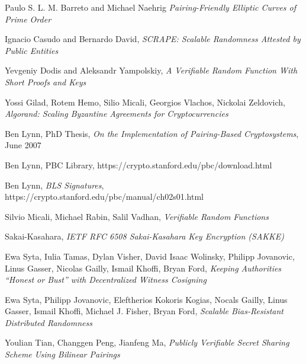 \documentclass{yellowpaper}
\begin{document}
\begin{thebibliography}{99}

Paulo S. L. M. Barreto and Michael Naehrig
{\em{Pairing-Friendly Elliptic Curves of Prime Order}}

Ignacio Casudo and Bernardo David, 
{\em{ SCRAPE: Scalable Randomness Attested by Public Entities}} 

Yevgeniy Dodis and Aleksandr Yampolskiy, 
{\em{A Verifiable Random Function With Short Proofs and Keys}}

Yossi Gilad, Rotem Hemo, Silio Micali, Georgios Vlachos, Nickolai Zeldovich,
{\em{Algorand: Scaling Byzantine Agreements for Cryptocurrencies}}

 Ben Lynn, PhD Thesis, 
{\em{On the Implementation of Pairing-Based Cryptosystems}}, June 2007

 Ben Lynn, PBC Library, 
https://crypto.stanford.edu/pbc/download.html

 Ben Lynn, 
{\em{BLS Signatures}}, 
https://crypto.stanford.edu/pbc/manual/ch02s01.html

Silvio Micali, Michael Rabin, Salil Vadhan, 
{\em{Verifiable Random Functions}}

Sakai-Kasahara, 
{\em{IETF RFC 6508 Sakai-Kasahara Key Encryption (SAKKE)}} 

Ewa Syta, Iulia Tamas, Dylan Visher, David Isaac Wolinsky, Philipp Jovanovic, Linus Gasser, Nicolas Gailly, Ismail Khoffi, Bryan Ford, 
{\em{Keeping Authorities ``Honest or Bust'' with Decentralized Witness Cosigning}}

 Ewa Syta, Philipp Jovanovic, Eleftherios Kokoris Kogias, Nocals Gailly, Linus Gasser, Ismail Khoffi, Michael J. Fisher, Bryan Ford, 
{\em{Scalable Bias-Resistant Distributed Randomness}}

 Youlian Tian, Changgen Peng, Jianfeng Ma, 
{\em{Publicly Verifiable Secret Sharing Scheme Using Bilinear Pairings}}

\end{thebibliography} 
\end{document}
